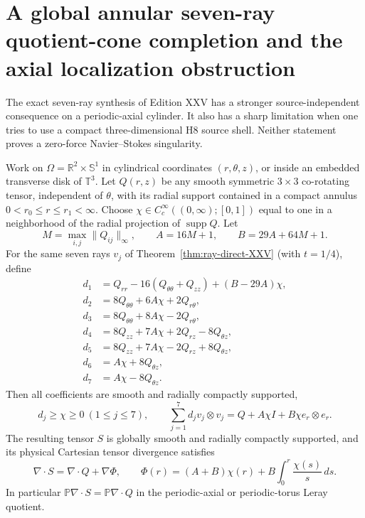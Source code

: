 
\section{A global annular seven-ray quotient-cone completion and the axial localization obstruction}
\label{sec:xxvi-global-ray}

The exact seven-ray synthesis of Edition XXV has a stronger
source-independent consequence on a periodic-axial cylinder. It
also has a sharp limitation when one tries to use a compact
three-dimensional H8 source shell. Neither statement proves a
zero-force Navier--Stokes singularity.

\begin{theorem}
\label{thm:xxvi-global-cone}
Work on $\Omega=\mathbb R^2\times\mathbb S^1$ in cylindrical
coordinates $(r,\theta,z)$, or inside an embedded transverse
disk of $\mathbb T^3$. Let $Q(r,z)$ be any smooth symmetric
$3\times3$ co-rotating tensor, independent of $\theta$, with
its radial support contained in a compact annulus
$0<r_0\le r\le r_1<\infty$.
Choose $\chi\in C_c^\infty((0,\infty);[0,1])$ equal to one
in a neighborhood of the radial projection of $\operatorname{supp}Q$.
Let
\[
M=\max_{i,j}\|Q_{ij}\|_\infty,\qquad
A=16M+1,\qquad B=29A+64M+1.
\]
For the same seven rays $v_j$ of
Theorem~\ref{thm:ray-direct-XXV} (with $t=1/4$), define
\begin{align*}
d_1&=Q_{rr}-16(Q_{\theta\theta}+Q_{zz})+(B-29A)\chi,\\
d_2&=8Q_{\theta\theta}+6A\chi+2Q_{r\theta},\\
d_3&=8Q_{\theta\theta}+8A\chi-2Q_{r\theta},\\
d_4&=8Q_{zz}+7A\chi+2Q_{rz}-8Q_{\theta z},\\
d_5&=8Q_{zz}+7A\chi-2Q_{rz}+8Q_{\theta z},\\
d_6&=A\chi+8Q_{\theta z},\\
d_7&=A\chi-8Q_{\theta z}.
\end{align*}
Then all coefficients are smooth and radially compactly supported,
\begin{equation}\label{eq:xxvi-cone}
\boxed{\quad d_j\ge\chi\ge0\ (1\le j\le7),\qquad
\sum_{j=1}^7d_jv_j\otimes v_j
=Q+A\chi I+B\chi e_r\otimes e_r.\quad}
\end{equation}
The resulting tensor $S$ is globally smooth and radially compactly
supported, and its physical Cartesian tensor divergence satisfies
\begin{equation}\label{eq:xxvi-pressure-quotient}
\boxed{\quad
\nabla\cdot S=\nabla\cdot Q+\nabla\Phi,\qquad
\Phi(r)=(A+B)\chi(r)+B\int_0^r\frac{\chi(s)}s\,ds.\quad}
\end{equation}
In particular $\mathbb P\nabla\cdot S
=\mathbb P\nabla\cdot Q$ in the periodic-axial or periodic-torus
Leray quotient.
\end{theorem}
